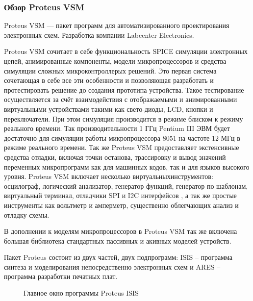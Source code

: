 \subsubsection{Обзор Proteus VSM}
\begin{par}
Proteus VSM --- пакет программ для автоматизированного проектирования электронных схем.
    Разработка компании Labcenter Electronics.
\end{par}
\begin{par}
Proteus VSM сочитает в себе функциональность SPICE симуляции электронных цепей,
анимированные компоненты, модели микропроцессоров и средства симуляции сложных
микроконтроллерых решений. Это первая система сочетающая в себе все эти особенности
и позволяющая разработать и протестировать решение до создания прототипа устройства.
Такое тестирование осуществляется за счёт взаимодействия с отображаемыми и анимированными
виртуальными устройствами такими как свето-диоды, LCD, кнопки и переключатели.
При этом симуляция производится в режиме блиском к режиму реального времени.
Так производительности 1 ГГц Pentium III ЭВМ будет достаточно для симуляции работы
микропроцессора 8051 на частоте 12 МГц в режиме реального времени. Так же Proteus VSM
предоставляет экстенсивные средства отладки, включая точки останова, трассировку и вывод
значений  переменных микропрограмм как для машинных кодов, так и для языков высокого
уровня. Proteus VSM  включает несколько виртуальныхинструментов: осцилограф, логический
анализатор, генератор функций, генератор по шаблонам, виртуальный терминал, отладчики SPI
и I2C интерфейсов , а так же простые инструменты как вольтметр и амперметр, существенно
облегчающих анализ и отладку схемы.
\end{par}
\begin{par}
В дополнении к моделям микропроцессоров в Proteus VSM так же включена большая библиотека
стандартных пассивных и акивных моделей устройств.
\end{par}
\begin{par}
Пакет Proteus состоит из двух частей, двух подпрограмм: ISIS – программа синтеза и
моделирования непосредственно электронных схем и ARES – программа разработки печатных
плат.

\begin{figure}[h]
	\caption{Главное окно программы Proteus ISIS}
	\label{img:proteus}
\end{figure}

\end{par}

